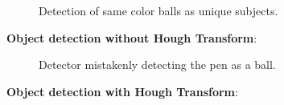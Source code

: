 \documentclass{sciposter}
\begin{document}
\begin{multicols}{3}
\begin{figure}[!h]
	\centering
			\setlength{\fboxsep}{1pt}
			\setlength{\fboxrule}{1pt}
	\caption{Detection of same color balls as unique subjects.}
	\label{fig:same_color}
\end{figure}

\textbf{Object detection without Hough Transform}:

\begin{figure}[!h]
	\centering
			\setlength{\fboxsep}{1pt}
			\setlength{\fboxrule}{1pt}
	\caption{Detector mistakenly detecting the pen as a ball.}
	\label{fig:not_hough}
\end{figure}

\textbf{Object detection with Hough  Transform}:


\end{multicols}
\end{document}
